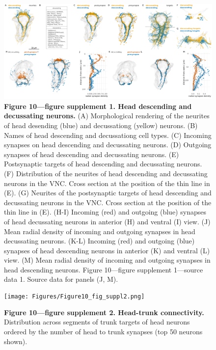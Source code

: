 \documentclass[
  11pt,
]{article}
\begin{document}
\begin{figure}[H]

{\centering \includegraphics[width=1\textwidth,height=\textheight]{Figures/Figure10_fig_suppl1.png}

}

\caption{\textbf{Figure 10---figure supplement 1. Head descending and
decussating neurons.} (A) Morphological rendering of the neurites of
head desending (blue) and decussationg (yellow) neurons. (B) Names of
head descending and decussationg cell types. (C) Incoming synapses on
head descending and decussating neurons. (D) Outgoing synapses of head
descending and decussating neurons. (E) Postsynaptic targets of head
descending and decussating neurons. (F) Distribution of the neurites of
head descending and decussating neurons in the VNC. Cross section at the
position of the thin line in (E). (G) Neurites of the postsynaptic
targets of head descending and decussating neurons in the VNC. Cross
section at the position of the thin line in (E). (H-I) Incoming (red)
and outgoing (blue) synapses of head decussating neurons in anterior (H)
and ventral (I) view. (J) Mean radial density of incoming and outgoing
synapses in head decussating neurons. (K-L) Incoming (red) and outgoing
(blue) synapses of head descending neurons in anterior (K) and ventral
(L) view. (M) Mean radial density of incoming and outgoing synapses in
head descending neurons. Figure 10---figure supplement 1---source data
1. Source data for panels (J, M).}

\end{figure}%

\begin{figure}[H]

{\centering \texttt{[image: Figures/Figure10\_fig\_suppl2.png]}

}

\caption{\textbf{Figure 10---figure supplement 2. Head-trunk
connectivity.} Distribution across segments of trunk targets of head
neurons ordered by the number of head to trunk synapses (top 50 neurons
shown).}

\end{figure}%
\end{document}

